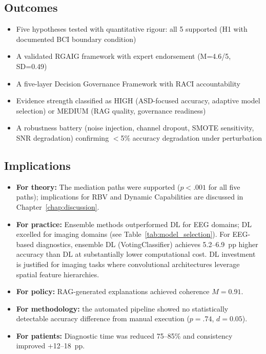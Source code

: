 \subsection{Outcomes}

\begin{itemize}
  \item Five hypotheses tested with quantitative rigour: all 5 supported (H1 with documented BCI boundary condition)
  \item A validated RGAIG framework with expert endorsement (M=4.6/5, SD=0.49)
  \item A five-layer Decision Governance Framework with RACI accountability
  \item Evidence strength classified as HIGH (ASD-focused accuracy, adaptive model selection) or MEDIUM (RAG quality, governance readiness)
  \item A robustness battery (noise injection, channel dropout, SMOTE sensitivity, SNR degradation) confirming $<$5\% accuracy degradation under perturbation
\end{itemize}

\subsection{Implications}

\begin{itemize}
  \item \textbf{For theory:} The mediation paths were supported ($p < .001$ for all five paths); implications for RBV and Dynamic Capabilities are discussed in Chapter~\ref{chap:discussion}.
  \item \textbf{For practice:} Ensemble methods outperformed DL for EEG domains; DL excelled for imaging domains (see Table~\ref{tab:model_selection}). For EEG-based diagnostics, ensemble DL (VotingClassifier) achieves 5.2--6.9~pp higher accuracy than DL at substantially lower computational cost. DL investment is justified for imaging tasks  where convolutional architectures leverage spatial feature hierarchies.
  \item \textbf{For policy:} RAG-generated explanations achieved coherence $M = 0.91$.
  \item \textbf{For methodology:} the automated pipeline showed no statistically detectable accuracy difference from manual execution ($p = .74$, $d = 0.05$).
  \item \textbf{For patients:} Diagnostic time was reduced 75--85\% and consistency improved +12--18~pp.
\end{itemize}
\fi

